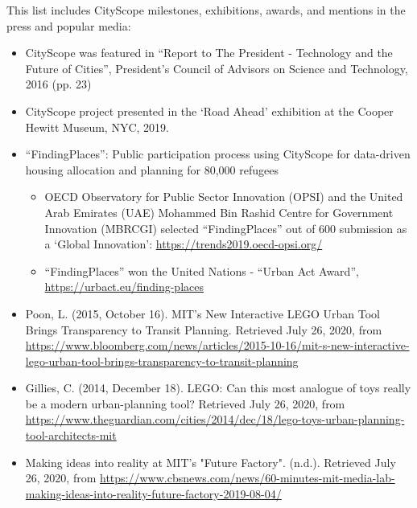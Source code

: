{This list includes CityScope milestones, exhibitions, awards, and mentions in the press and popular media:

      \begin{itemize}

            \item{CityScope was featured in “Report to The President - Technology and the Future of Cities”, President's Council of Advisors on Science and Technology, 2016 (pp. 23)}

            \item{CityScope project presented in the `Road Ahead' exhibition at the Cooper Hewitt Museum, NYC, 2019.}

            \item{“FindingPlaces”: Public participation process using CityScope for data-driven housing allocation and planning for 80,000 refugees}

            \begin{itemize}
                  \item{
                              OECD Observatory for Public Sector Innovation (OPSI) and the United Arab Emirates (UAE) Mohammed Bin Rashid Centre for Government Innovation (MBRCGI) selected “FindingPlaces” out of 600 submission as a `Global Innovation': \url{https://trends2019.oecd-opsi.org/}
                        }

                  \item{
                              “FindingPlaces” won the United Nations - “Urban Act Award”, \url{https://urbact.eu/finding-places}
                        }
            \end{itemize}

            \item{
                        Poon, L. (2015, October 16). MIT's New Interactive LEGO Urban Tool Brings Transparency to Transit Planning. Retrieved July 26, 2020, from \url{https://www.bloomberg.com/news/articles/2015-10-16/mit-s-new-interactive-lego-urban-tool-brings-transparency-to-transit-planning}
                  }

            \item{
                        Gillies, C. (2014, December 18). LEGO: Can this most analogue of toys really be a modern urban-planning tool? Retrieved July 26, 2020, from \url{https://www.theguardian.com/cities/2014/dec/18/lego-toys-urban-planning-tool-architects-mit}
                  }

            \item{
                        Making ideas into reality at MIT's "Future Factory". (n.d.). Retrieved July 26, 2020, from \url{https://www.cbsnews.com/news/60-minutes-mit-media-lab-making-ideas-into-reality-future-factory-2019-08-04/}
                  }


\end{itemize}}
